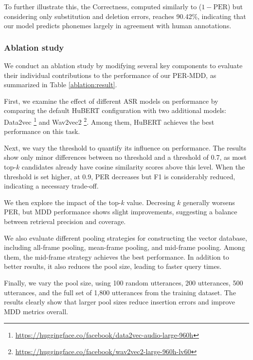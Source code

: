 \documentclass{article}
\begin{document}
To further illustrate this, the Correctness, computed similarly to ($1-\text{PER}$) but considering only substitution and deletion errors, reaches 90.42\%, indicating that our model predicts phonemes largely in agreement with human annotations.

\subsubsection{Ablation study}
We conduct an ablation study by modifying several key components to evaluate their individual contributions to the performance of our PER-MDD, as summarized in Table \ref{ablation:result}. 

First, we examine the effect of different ASR models on performance by comparing the default HuBERT configuration with two additional models: Data2vec \cite{data2vec}\footnote{\url{https://huggingface.co/facebook/data2vec-audio-large-960h}}
 and Wav2vec2 \cite{wav2vec2}\footnote{\url{https://huggingface.co/facebook/wav2vec2-large-960h-lv60}}. Among them, HuBERT achieves the best performance on this task. 

Next, we vary the threshold to quantify its influence on performance. The results show only minor differences between no threshold and a threshold of 0.7, as most top-$k$ candidates already have cosine similarity scores above this level. When the threshold is set higher, at 0.9, PER decreases but F1 is considerably reduced, indicating a necessary trade-off.

We then explore the impact of the top-$k$ value. Decresing $k$ generally worsens PER, but MDD performance shows slight improvements, suggesting a balance between retrieval precision and coverage. 

We also evaluate different pooling strategies for constructing the vector database, including all-frame pooling, mean-frame pooling, and mid-frame pooling. Among them, the mid-frame strategy achieves the best performance. In addition to better results, it also reduces the pool size, leading to faster query times.

Finally, we vary the pool size, using 100 random utterances, 200 utterances, 500 utterances, and the full set of 1,800 utterances from the training dataset. The results clearly show that larger pool sizes reduce insertion errors and improve MDD metrics overall.
\end{document}

